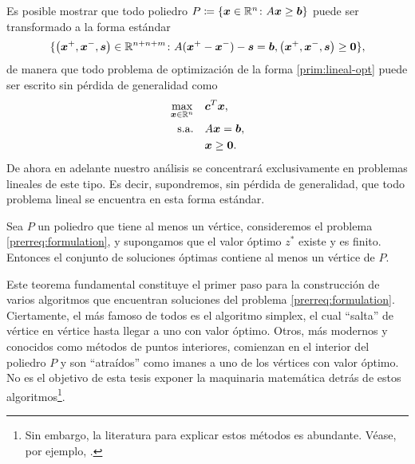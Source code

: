 Es posible mostrar que todo poliedro $P \coloneq \lbrace \boldsymbol{x} \in \mathbb{R}^n \colon A\boldsymbol{x} \geq
\boldsymbol{b} \rbrace$ puede ser transformado a la forma estándar
\begin{equation*}
	\lbrace \left( \boldsymbol{x}^+, \boldsymbol{x}^-, \boldsymbol{s} \right) \in \mathbb{R}^{n + n + m} \colon A(\boldsymbol{x}^+ -
\boldsymbol{x}^-) - \boldsymbol{s} = \boldsymbol{b}, \left(\boldsymbol{x}^+, \boldsymbol{x}^-, \boldsymbol{s}\right) \geq \boldsymbol{0}\rbrace,
\end{equation*}
de manera que todo problema de optimización de la forma \eqref{prim:lineal-opt} puede ser escrito
sin pérdida de generalidad como
\begin{subequations}
	\label{prerreq:formulation}
	\begin{align}
		\max_{\boldsymbol{x} \in \mathbb{R}^n} \quad
			& \boldsymbol{c}^T\boldsymbol{x}, \label{prerreq:formulation:objective} \\
		\text{s.a.} \quad
			& A\boldsymbol{x} = \boldsymbol{b}, \label{prerreq:formulation:constraints} \\
			& \boldsymbol{x} \geq \boldsymbol{0} \nonumber.
	\end{align}
\end{subequations}
De ahora en adelante nuestro análisis se concentrará exclusivamente en problemas lineales de este
tipo. Es decir, supondremos, sin pérdida de generalidad, que todo problema lineal se encuentra en
esta forma estándar.

\begin{theorem}
	\label{prerreq:th:linear-sol}
	Sea $P$ un poliedro que tiene al menos un vértice, consideremos el problema
	\eqref{prerreq:formulation}, y supongamos que el valor óptimo $z^*$ existe y es finito. Entonces
	el conjunto de soluciones óptimas contiene al menos un vértice de $P$.
\end{theorem}

Este teorema fundamental constituye el primer paso para la construcción de varios algoritmos que
encuentran soluciones del problema \eqref{prerreq:formulation}. Ciertamente, el más famoso de todos
es el algoritmo simplex, el cual ``salta'' de vértice en vértice hasta llegar a uno con valor
óptimo. Otros, más modernos y conocidos como métodos de puntos interiores, comienzan en el interior
del poliedro $P$ y son ``atraídos'' como imanes a uno de los vértices con valor óptimo. No es el
objetivo de esta tesis exponer la maquinaria matemática detrás de estos algoritmos\footnote{
	Sin embargo, la literatura para explicar estos métodos es abundante. Véase, por ejemplo,
	\cite{nocedal}.
}.

